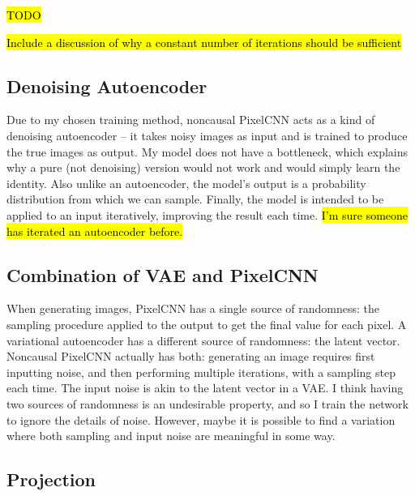 \documentclass[11pt, a4paper, openany]{book}
\begin{document}
\hl{TODO}

\hl{Include a discussion of why a constant number of iterations should be sufficient}

\citep{brnndenoise}

\subsection{Denoising Autoencoder}

Due to my chosen training method, noncausal PixelCNN acts as a kind of denoising autoencoder \citep{denoisingautoencoder, stackeddenoising} -- it takes noisy images as input and is trained to produce the true images as output. My model does not have a bottleneck, which explains why a pure (not denoising) version would not work and would simply learn the identity. Also unlike an autoencoder, the model's output is a probability distribution from which we can sample. Finally, the model is intended to be applied to an input iteratively, improving the result each time. \hl{I'm sure someone has iterated an autoencoder before.}

\subsection{Combination of VAE and PixelCNN}

When generating images, PixelCNN has a single source of randomness: the sampling procedure applied to the output to get the final value for each pixel. A variational autoencoder \citep{vae} has a different source of randomness: the latent vector. Noncausal PixelCNN actually has both: generating an image requires first inputting noise, and then performing multiple iterations, with a sampling step each time. The input noise is akin to the latent vector in a VAE. I think having two sources of randomness is an undesirable property, and so I train the network to ignore the details of noise. However, maybe it is possible to find a variation where both sampling and input noise are meaningful in some way.

\subsection{Projection}
\end{document}
